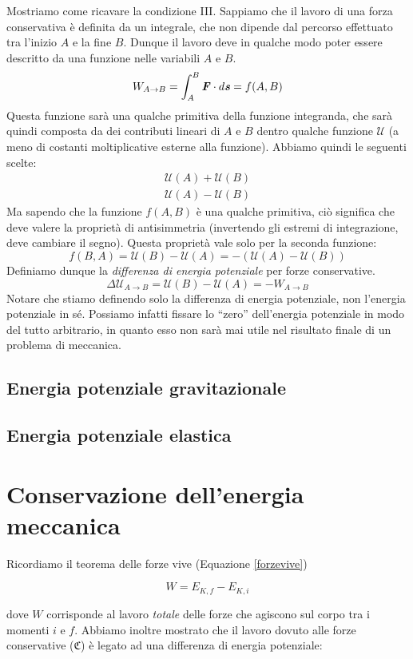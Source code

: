Mostriamo come ricavare la condizione III. Sappiamo che il lavoro di una
forza conservativa è definita da un integrale, che non dipende dal percorso
effettuato tra l'inizio $A$ e la fine $B$. Dunque il lavoro deve in qualche modo
poter essere descritto da una funzione nelle variabili $A$ e $B$.
\[ W_{A \to B} = \int_{A}^{B}\textbf{\textit{F}}\cdot d\textbf{\textit{s}} = f(A,B) \]
Questa funzione sarà una qualche primitiva della funzione integranda, che sarà
quindi composta da dei contributi lineari di $A$ e $B$ dentro qualche funzione
$\mathcal{U}$ (a meno di costanti moltiplicative esterne alla funzione).
Abbiamo quindi le seguenti scelte:
\begin{align*}
    \mathcal{U}(A) + \mathcal{U}(B)\\
    \mathcal{U}(A) - \mathcal{U}(B)
\end{align*}
Ma sapendo che la funzione $f(A,B)$ è una qualche primitiva, ciò significa che
deve valere la proprietà di antisimmetria (invertendo gli estremi di integrazione,
deve cambiare il segno). Questa proprietà vale solo per la seconda funzione:
\[ f(B,A) = \mathcal{U}(B) - \mathcal{U}(A) = - (\mathcal{U}(A) - \mathcal{U}(B)) \]
Definiamo dunque la \textit{differenza di energia potenziale} per forze conservative.
\[ \Delta\mathcal{U}_{A\to B} = \mathcal{U}(B) - \mathcal{U}(A) = -W_{A\to B} \]
Notare che stiamo definendo solo la differenza di energia potenziale, non l'energia
potenziale in sé. Possiamo infatti fissare lo ``zero'' dell'energia potenziale in
modo del tutto arbitrario, in quanto esso non sarà mai utile nel risultato finale
di un problema di meccanica.

\subsection{Energia potenziale gravitazionale}
\subsection{Energia potenziale elastica}

\section[Conservazione]{Conservazione dell'energia meccanica}
Ricordiamo il teorema delle forze vive (Equazione \ref{forzevive})

\[ W = E_{K,f} - E_{K,i} \]

\noindent dove $W$ corrisponde al lavoro \textit{totale} delle forze
che agiscono sul corpo tra i momenti $i$ e $f$.
Abbiamo inoltre mostrato che il lavoro dovuto alle forze conservative ($\mathfrak{C}$)
è legato ad una differenza di energia potenziale:

